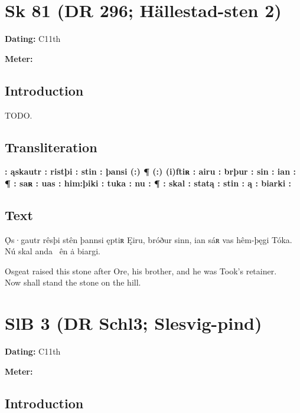 \sectionline\newpage


\section{Sk 81 (DR 296; Hällestad-sten 2)}

\begin{flushright}%
\textbf{Dating:} C11th

\textbf{Meter:} \Fornyrdislag
\end{flushright}%

\subsection{Introduction}

TODO.

\subsection{Transliteration}

\textbf{: ąskautr : ristþi : stin : þansi (:) ¶ (:) (i)ftiʀ : airu : brþur : sin : ian : ¶ : saʀ : uas : him:þiki : tuka : nu : ¶ : skal : statą : stin : ą : biarki :}

\subsection{Text}

\bpg\bpa[0]%
\startsub Ǫ̇s·gautr rêsþi stên þannsi ęptiʀ Ęiru, bróður sinn, ian sáʀ vas hêm-þęgi Tóka.\endsub
Nú skal anda \hld\ ên ȧ biargi.\epa

\bpb Osgeat raised this stone after Ore, his brother, and he was Took’s retainer. \\
Now shall stand the stone on the hill.\epb\epg

\sectionline\newpage


\section{SlB 3 (DR Schl3; Slesvig-pind)}

\begin{flushright}%
\textbf{Dating:} C11th

\textbf{Meter:} \Ljodahattr
\end{flushright}%

\subsection{Introduction}

